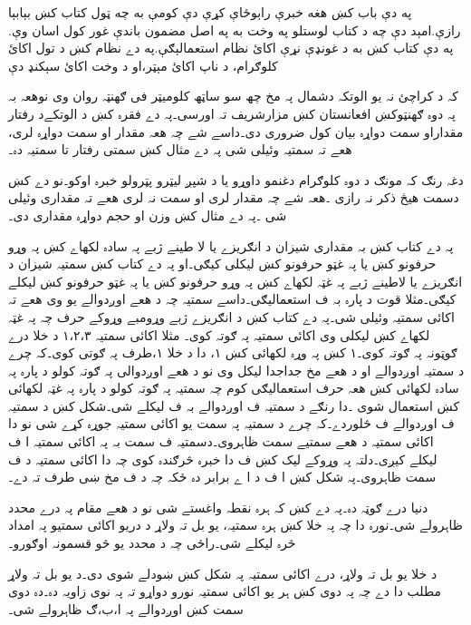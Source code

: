 په دې باب کښ هغه خبرې راېوځاې کړې دې کومې به چه ټول کتاب کښ بېابېا رازې.امېد دې چه د کتاب لوستلو په وخت به په اصل مضمون باندې غور کول اسان وې.
په دې کتاب کښ به د غونډې نړې اکائ نظام  استعمالېګې.په دے نظام کښ د تول اکائ کلوګرام، د ناپ اکائ مېټر،او د وخت اکائ سېکنډ دې 

      
کہ د کراچئ نہ یو الوتکہ دشمال پہ مخ چھ سو ساټھ کلومیټر فی ګھنټہ روان وی نوھعہ بہ پہ دوہ ګھنټوکښ افعانستان کښ مزارشریف تہ اورسی۔پہ دے فقرہ کښ د الوتکےد رفتار مقداراو سمت دواړہ بیان کول ضروری دی۔داسے شے چہ ھعہ مقدار او سمت دواړہ لری، ھعے تہ سمتیہ وئیلی شی پہ دے مثال کښ سمتی رفتار تا سمتیہ دہ۔

دغہ رنګ کہ مونګ د دوہ کلوګرام دغنمو داوړو یا د شپږ لیټرو پټرولو خبرہ اوکو۔نو دے کښ دسمت ھیڅ ذکر نہ رازی ۔ھعہ شے چہ مقدار لری او سمت نہ لری ھعے تہ مقداری وئیلی شی ۔پہ دے مثال کښ وزن او حجم دواړہ مقداری دی۔
 
پہ دے کتاب کښ بہ مقداری شیزان د انګریزے یا لا طینے ژبے پہ سادہ لکھاے کښ پہ وړو حرفونو کښ یا پہ غټو حرفونو کښ لیکلی کیګی۔او پہ دے کتاب کښ سمتیہ شیزان د انګریزے یا لاطینے ژبے پہ غټہ لکھاے کښ پہ وړو حرفونو کښ یا پہ غټو حرفونو کښ لیکلے کیګی۔مثلا قوت د پارہ بہ ف استعمالیګی۔داسے سمتیہ چہ د ھعے اوږدوالے یو وی ھعے تہ اکائی سمتیہ وئیلی شی۔پہ دے کتاب کښ د انګریزے ژبے وړومبے وړوکے حرف چہ پہ غټہ  لکھاے کښ لیکلی وی اکائی سمتیہ پہ ګوتہ کوی۔ مثلا اکائی سمتیہ  ۱،۲،۳ د خلا درے ګوټونہ پہ ګوتہ کوی۔۱ کښ پہ وړہ لکھائی کښ ۱، دا د خلا ۱،طرف پہ ګوتی کوی۔کہ چرے د سمتیہ اوږدوالے او د ھعے مخ جداجدا لیکل وی نو د ھعے اوږدوالی پہ ګوتہ کولو د پارہ پہ سادہ لکھائی کښ ھعہ حرف استعمالیګی کوم چہ سمتیہ پہ ګوتہ کولو د پارہ پہ غټہ لکھائی کښ استعمال شوی ۔دا رنګے د سمتیہ ف اوږدوالے بہ ف لیکلے شی۔شکل کښ د سمتیہ ف اوږدوالے ف څلوردے۔کہ چرے د سمتیہ پہ سمت یو اکائی سمتیہ جوړہ کړے شی نو دا اکائی سمتیہ د ھعے سمتیے سمت ظاہروی۔دسمتیہ ف سمت بہ پہ اکائی سمتیہ ا ف لیکلے کیږی۔دلتہ پہ وړوکے لیک کښ  ف دا خبرہ څرګندہ کوی چہ دا اکائی سمتیہ د ف سمت ظاہروی۔پہ شکل کښ ا ف د ا ے برابر دہ ځکہ چہ د ف مخ ښی طرف تہ دے۔     

   دنیا درے ګوټہ دہ۔پہ دے کښ کہ ہرہ نقطہ واغستے شی نو د ھعے مقام پہ درے محدد ظاہرولے شی۔نورہ دا چہ پہ خلا کښ ہرہ سمتیہ،  یو بل تہ ولاړ د دریو اکائی سمتیو پہ امداد څرہ لیکلے شی۔راځی چہ د محدد یو څو قسمونہ اوګورو۔ 

د خلا یو بل تہ ولاړ، درے اکائی سمتیہ پہ شکل کښ ښودلے شوی دی۔د یو بل تہ ولاړ مطلب دا دے چہ پہ دوی کښ ہر یو اکائی سمتیہ نورو دواړو تہ پہ نوی زاویہ دہ۔دہ دوی  سمت کښ اوږدوالے پہ ا،ب،ګ ظاہرولے شی۔  


